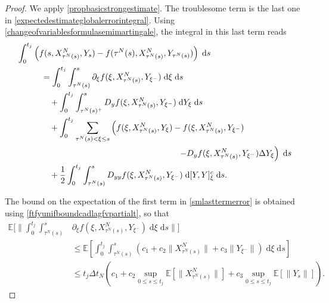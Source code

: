 \documentclass[reqno,12pt]{amsart}
\theoremstyle{plain} %
\theoremstyle{definition} %
\begin{document}
\begin{proof}
    We apply \cref{propbasicstrongestimate}. The troublesome term is the last one in \cref{expectedestimateglobalerrorintegral}. Using \cref{changeofvariablesformulasemimartingale}, the integral in this last term reads
    \begin{equation}
        \label{smlasttermerror}
        \begin{aligned}
            \int_0^{t_j} & \left( f(s, X_{\tau^N(s)}^N, Y_s) - f(\tau^N(s), X_{\tau^N(s)}^N, Y_{\tau^N(s)}) \right)\;\mathrm{d}s \\
            & \quad = \int_0^{t_j} \int_{\tau^N(s)}^s \partial_\xi f(\xi, X_{\tau^N(s)}^N, Y_{\xi^-})\;\mathrm{d}\xi \;\mathrm{d}s \\
            & \qquad + \int_0^{t_j} \int_{\tau^N(s)^+}^s D_y f(\xi, X_{\tau^N(s)}^N, Y_{\xi^-}) \;\mathrm{d}Y_\xi \;\mathrm{d}s \\
            & \qquad + \int_0^{t_j} \sum_{\tau^N(s) < \xi \leq s} \left(f(\xi, X_{\tau^N(s)}^N, Y_\xi) - f(\xi, X_{\tau^N(s)}^N, Y_{\xi^{-}}) \right. \\
            & \hspace{2.4in} \left. - D_y f(\xi, X_{\tau^N(s)}^N, Y_{\xi^-})\Delta Y_\xi\right) \;\mathrm{d}s \\ 
            & \qquad + \frac{1}{2} \int_0^{t_j} \int_{\tau^N(s)}^s D_{yy}f(\xi, X_{\tau^N(s)}^N, Y_{\xi^-})\;\mathrm{d}[Y, Y]_\xi^c\;\mathrm{d}s.
        \end{aligned}
    \end{equation}
    
    The bound on the expectation of the first term in \cref{smlasttermerror} is obtained using \cref{ftfyunifboundcadlagfvpartialt}, so that
    \begin{equation}
        \label{strongorderterm1}
        \begin{aligned}
            \mathbb{E}\bigg[\bigg\| \int_0^{t_j} \int_{\tau^N(s)}^s & \partial_\xi f(\xi, X_{\tau^N(s)}^N, Y_{\xi^-})\;\mathrm{d}\xi\;\mathrm{d}s\bigg\|\bigg] \\
            & \leq \mathbb{E}\left[\int_0^{t_j} \int_{\tau^N(s)}^s \left(c_1 + c_2 \|X_{\tau^N(s)}^N\| + c_3\|Y_{\xi^-}\|\right)\;\mathrm{d}\xi\;\mathrm{d}s\right] \\
            & \leq t_j \Delta t_N \left(c_1 + c_2 \sup_{0\leq s \leq t_j} \mathbb{E}\left[\|X_{\tau^N(s)}^N\|\right] + c_3\sup_{0 \leq s \leq t_j}\mathbb{E}\left[\|Y_s\|\right]\right).
        \end{aligned}
    \end{equation}


\end{proof}
\end{document}
